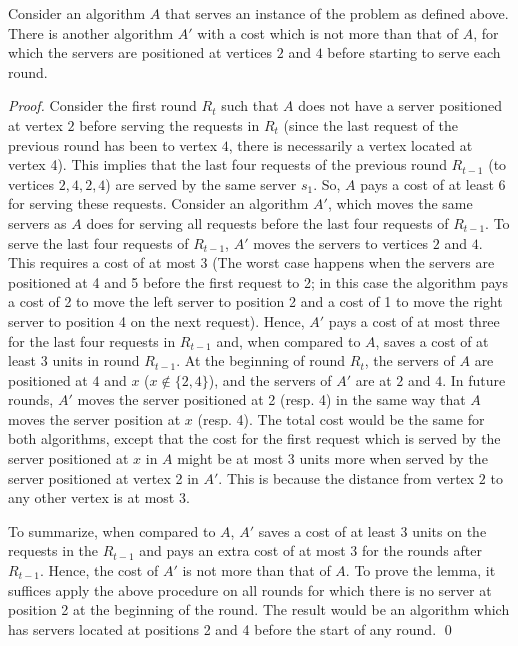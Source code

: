 \begin{lemma}
Consider an algorithm $A$ that serves an instance of the problem as defined above. There is another algorithm $A'$ with a cost which is not more than that of $A$, for which the servers are positioned at vertices $2$ and $4$ before starting to serve each round.
\end{lemma}

\begin{proof}
Consider the first round $R_t$ such that $A$ does not have a server positioned at vertex $2$ before serving the requests in $R_t$ (since the last request of the previous round has been to vertex $4$, there is necessarily  a vertex located at vertex 4). This implies that the last four requests of the previous round $R_{t-1}$ (to vertices $2,4,2,4$) are served by the same server $s_1$. So, $A$ pays a cost of at least 6 for serving these requests. Consider an algorithm $A'$, which moves the same servers as $A$ does for serving all requests before the last four requests of $R_{t-1}$. To serve the last four requests of $R_{t-1}$, $A'$ moves the servers to vertices $2$ and $4$. This requires a cost of at most $3$ (The worst case happens when the servers are positioned at 4 and 5 before the first request to 2; in this case the algorithm pays a cost of 2 to move the left server to position 2 and a cost of 1 to move the right server to position 4 on the next request). Hence, $A'$ pays a cost of at most three for the last four requests in $R_{t-1}$ and, when compared to $A$, saves a cost of at least 3 units in round $R_{t-1}$. At the beginning of round $R_{t}$, the servers of $A$ are positioned at $4$ and $x$ ($x\notin\{2,4\}$), and the servers of $A'$ are at $2$ and $4$. 
In future rounds, $A'$ moves the server positioned at 2 (resp. 4) in the same way that $A$ moves the server position at $x$ (resp. 4). The total cost would be the same for both algorithms, except that the cost for the first request which is served by the server positioned at $x$ in $A$ might be at most 3 units more when served by the server positioned at vertex 2 in $A'$. This is because the distance from vertex $2$ to any other vertex is at most $3$.  

To summarize, when compared to $A$, $A'$ saves a cost of at least $3$ units on the requests in the $R_{t-1}$ and pays an extra cost of at most $3$ for the rounds after $R_{t-1}$. Hence, the cost of $A'$ is not more than that of $A$. To prove the lemma, it suffices apply the above procedure on all rounds for which there is no server at position 2 at the beginning of the round. The result would be an algorithm which has servers located at positions 2 and 4 before the start of any round. \qed
\end{proof}


